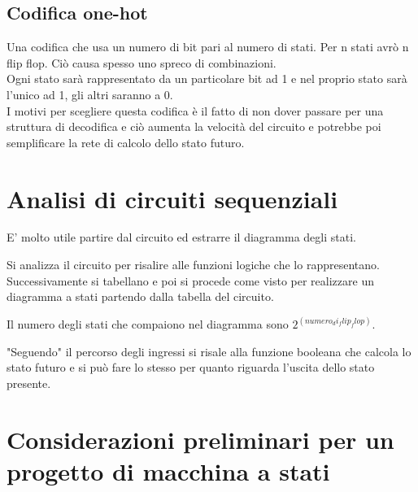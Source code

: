 \documentclass[a4paper]{book}
\begin{document}
\begin{center}


\end{center}

\subsection*{Codifica one-hot}

Una codifica che usa un numero di bit pari al numero di stati.
Per n stati avrò n flip flop.
Ciò causa spesso uno spreco di combinazioni.\\
Ogni stato sarà rappresentato da un particolare bit ad 1 e nel proprio stato sarà l'unico ad 1, gli altri saranno a 0.\\
I motivi per scegliere questa codifica è il fatto di non dover passare per una struttura di decodifica e ciò aumenta la velocità del circuito e potrebbe poi semplificare la rete di calcolo dello stato futuro.


\section{Analisi di circuiti sequenziali}

E' molto utile partire dal circuito ed estrarre il diagramma degli stati.

Si analizza il circuito per risalire alle funzioni logiche che lo rappresentano.
Successivamente si tabellano e poi si procede come visto per realizzare un diagramma a stati partendo dalla tabella del circuito.

Il numero degli stati che compaiono nel diagramma sono $2^(numero_di_flip_flop)$.

"Seguendo" il percorso degli ingressi si risale alla funzione booleana che calcola lo stato futuro e si può fare lo stesso per quanto riguarda l'uscita dello stato presente.

\section{Considerazioni preliminari per un progetto di macchina a stati}
\end{document}
